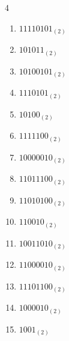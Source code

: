 \begin{multicols}{4}
\begin{enumerate}
        \phantom{$=39$}

  \item $11110101_{(2)}$

        \phantom{$=245$}

\columnbreak %

\resetques

  \item $101011_{(2)}$

        \phantom{$=43$}

  \item $10100101_{(2)}$

        \phantom{$=165$}

  \item $1110101_{(2)}$

        \phantom{$=117$}

  \item $10100_{(2)}$

        \phantom{$=20$}

  \item $1111100_{(2)}$

        \phantom{$=124$}

  \item $10000010_{(2)}$

        \phantom{$=130$}

  \item $11011100_{(2)}$

        \phantom{$=220$}

  \item $11010100_{(2)}$

        \phantom{$=212$}

  \item $110010_{(2)}$

        \phantom{$=50$}

  \item $10011010_{(2)}$

        \phantom{$=154$}

  \item $11000010_{(2)}$

        \phantom{$=194$}

  \item $11101100_{(2)}$

        \phantom{$=236$}

  \item $1000010_{(2)}$

        \phantom{$=66$}

  \item $1001_{(2)}$


\end{enumerate}
\end{multicols}

